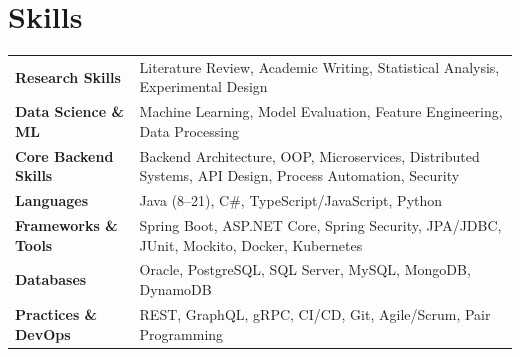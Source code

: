 \section{\textbf{Skills}}

\begin{tabularx}{\linewidth}{@{}l X@{}}
    \textbf{Research Skills} & Literature Review, Academic Writing, Statistical Analysis, Experimental Design \\
    \textbf{Data Science \& ML} & Machine Learning, Model Evaluation, Feature Engineering, Data Processing \\
    \textbf{Core Backend Skills} & Backend Architecture, OOP, Microservices, Distributed Systems, API Design, Process Automation, Security \\
    \textbf{Languages} & Java (8--21), C\#, TypeScript/JavaScript, Python \\
    \textbf{Frameworks \& Tools} & Spring Boot, ASP.NET Core, Spring Security, JPA/JDBC, JUnit, Mockito, Docker, Kubernetes \\
    \textbf{Databases} & Oracle, PostgreSQL, SQL Server, MySQL, MongoDB, DynamoDB \\
    \textbf{Practices \& DevOps} & REST, GraphQL, gRPC, CI/CD, Git, Agile/Scrum, Pair Programming \\
\end{tabularx}
